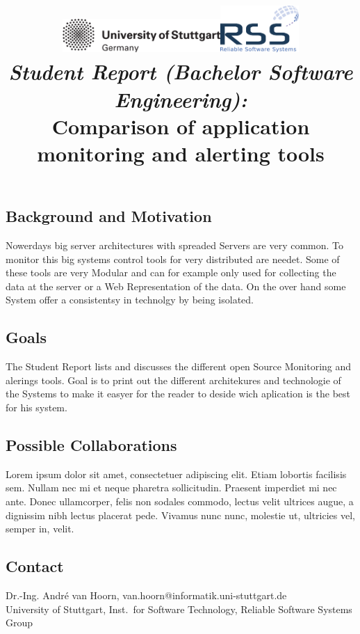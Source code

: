 \documentclass[a4paper,12pt]{article}
\date{}
\title{
\includegraphics[width=6cm]{figures/stuttgart-vector.pdf}\hfill{\includegraphics[width=3cm]{figures/rss_logo.pdf}}
\quad \\ [0.5cm]
{\large \textit{Student Report (Bachelor Software Engineering):}} \\ [1mm]
{\Large Comparison of application monitoring and alerting tools}
}
\begin{document}
	

\maketitle

\thispagestyle{empty}

\vspace{-2.5cm}


\subsection*{Background and Motivation}
Nowerdays big server architectures with spreaded Servers are very common. To monitor this big systems control tools for very distributed are needet. Some of these tools are very Modular and can for example only used for collecting the data at the server or  a Web Representation of the data. On the over hand some System offer a consistentsy in technolgy by being isolated.

\subsection*{Goals}
The Student Report lists and discusses the different open Source Monitoring and alerings tools. Goal is to print out the different architekures and technologie of the Systems to make it easyer for the reader to deside wich aplication is the best for his system.


\subsection*{Possible Collaborations}
Lorem ipsum dolor sit amet, consectetuer adipiscing elit. Etiam lobortis facilisis sem. Nullam nec
mi et neque pharetra sollicitudin. Praesent imperdiet mi nec ante. Donec ullamcorper, felis non
sodales commodo, lectus velit ultrices augue, a dignissim nibh lectus placerat pede. Vivamus nunc
nunc, molestie ut, ultricies vel, semper in, velit. \cite{pitakrat2016archaware}

\begin{scriptsize}


\end{scriptsize}

\subsection*{Contact}
Dr.-Ing. André van Hoorn, van.hoorn@informatik.uni-stuttgart.de \\
University of Stuttgart, Inst.\ for Software Technology, Reliable Software Systems Group \\
\end{document}
